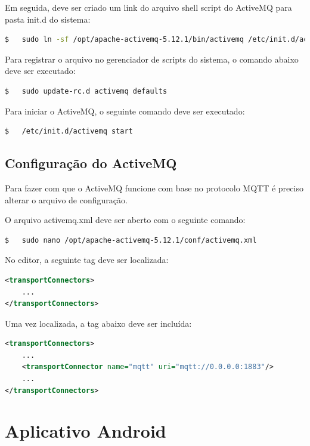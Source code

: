 Em seguida, deve ser criado um link do arquivo shell script do ActiveMQ para pasta init.d do sistema: \\

\begin{lstlisting}[language=bash]
$   sudo ln -sf /opt/apache-activemq-5.12.1/bin/activemq /etc/init.d/activemq
\end{lstlisting}

Para registrar o arquivo no gerenciador de scripts do sistema, o comando abaixo deve ser executado: \\

\begin{lstlisting}[language=bash]
$   sudo update-rc.d activemq defaults
\end{lstlisting}

Para iniciar o ActiveMQ, o seguinte comando deve ser executado: \\
 
\begin{lstlisting}[language=bash]
$   /etc/init.d/activemq start
\end{lstlisting}

\subsection{Configuração do ActiveMQ}
\label{sec:configuracao-activemq}

Para fazer com que o ActiveMQ funcione com base no protocolo MQTT é preciso alterar o arquivo de configuração.

O arquivo activemq.xml deve ser aberto com o seguinte comando: \\

\begin{lstlisting}[language=bash]
$   sudo nano /opt/apache-activemq-5.12.1/conf/activemq.xml
\end{lstlisting}

No editor, a seguinte tag deve ser localizada: \\

\begin{lstlisting}[language=xml]
<transportConnectors>
	...
</transportConnectors>
\end{lstlisting}

Uma vez localizada, a tag abaixo deve ser incluída: \\

\begin{lstlisting}[language=xml]
<transportConnectors>
	...
	<transportConnector name="mqtt" uri="mqtt://0.0.0.0:1883"/>
	...
</transportConnectors>
\end{lstlisting}

\section{Aplicativo Android}
\label{sec:aplicativo-android}